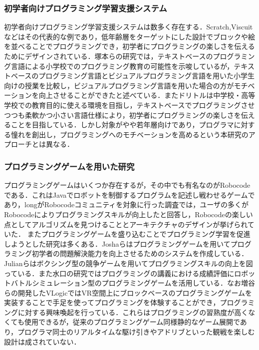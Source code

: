 \subsubsection{初学者向けプログラミング学習支援システム}
初学者向けプログラミング学習支援システムは数多く存在する．Scratch\cite{scratch},Viscuit\cite{viscuit}などはその代表的な例であり，低年齢層をターゲットにした設計でブロックや絵を並べることでプログラミングでき，初学者にプログラミングの楽しさを伝えるためにデザインされている．塚本らの研究では，テキストベースのプログラミング言語による小学校でのプログラミング教育の可能性を示唆しているが，テキストベースのプログラミング言語とビジュアルプログラミング言語を用いた小学生向けの授業を比較し，ビジュアルプログラミング言語を用いた場合の方がモチベーションを向上させることができたと述べている．\cite{tpl,tsukamoto}またドリトル\cite{dolittle}は中学校・高等学校での教育目的に使える環境を目指し，テキストベースでプログラミングさせつつも柔軟かつ小さい言語仕様により，初学者にプログラミングの楽しさを伝えることを目指している．しかし対象がやや若年層向けであり，プログラマに対する憧れを創出し，プログラミングへのモチベーションを高めるという本研究のアプローチとは異なる．

\subsubsection{プログラミングゲームを用いた研究}
プログラミングゲームはいくつか存在するが，その中でも有名なのがRobocodeである．これはJavaでロボットを制御するプログラムを記述し戦わせるゲームであり，longがRobocodeコミュニティを対象に行った調査\cite{long}では，ユーザの多くがRobocodeによりプログラミングスキルが向上したと回答し，Robocodeの楽しい点としてアルゴリズムを見つけることとアーキテクチャのデザインが挙げられていた．
またプログラミングゲームを盛り込むことでプログラミング学習を促進しようとした研究は多くある．Joshaらはプログラミングゲームを用いてプログラミング初学者の問題解決能力を向上させるためのシステムを作成している\cite{joshua}．Julianらはボクシング型の競争ゲームを用いてプログラミングスキルの向上を図っている\cite{julian}．また水口の研究ではプログラミングの講義における成績評価にロボットバトルシミュレーション型のプログラミングゲームを活用している\cite{minakuchi}．なお増谷らの開発したVLogic\cite{mashitani}ではVR空間上にブロックベースのプログラミングゲームを実装することで手足を使ってプログラミングを体験することができ，プログラミングに対する興味喚起を行っている．これらはプログラミングの習熟度が高くなくても使用できるが，従来のプログラミングゲーム同様静的なゲーム展開であり，プログラマ同士のリアルタイムな駆け引きやアドリブといった観戦を楽しむ設計は成されていない．


